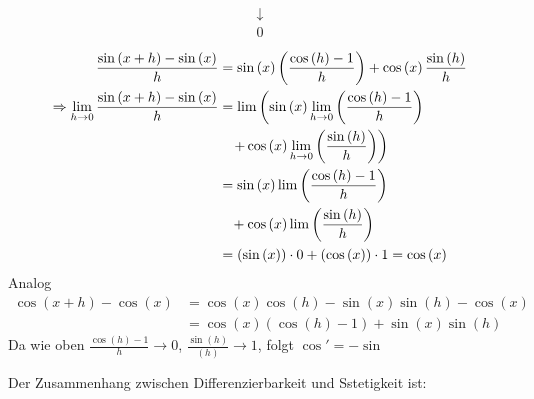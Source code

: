 \begin{enumerate}
\begin{align*}
{{{\begin{array}{*{20}{c}}
 \downarrow \\
0
\end{array}} }}
\end{align*}
\begin{align*}
\frac{{\sin \left( {x + h} \right) - \sin \left( x \right)}}{h} &= \sin \left( x \right)\left( {\frac{{\cos \left( h \right) - 1}}{h}} \right) + \cos \left( x \right)\frac{{\sin \left( h \right)}}{h}\\
 \Rightarrow \mathop {\lim }\limits_{h \to 0} \frac{{\sin \left( {x + h} \right) - \sin \left( x \right)}}{h} &= \lim \left( {\sin \left( x \right)\mathop {\lim }\limits_{h \to 0} \left( {\frac{{\cos \left( h \right) - 1}}{h}} \right)} \right.\\
&\left. { \hspace{3mm}+ \cos \left( x \right)\mathop {\lim }\limits_{h \to 0} \left( {\frac{{\sin \left( h \right)}}{h}} \right)} \right)\\
 &= \sin \left( x \right)\lim \left( {\frac{{\cos \left( h \right) - 1}}{h}} \right)\\
 &\hspace{3mm}+ \cos \left( x \right)\lim \left( {\frac{{\sin \left( h \right)}}{h}} \right)\\
& = \left( {\sin \left( x \right)} \right) \cdot 0 + \left( {\cos \left( x \right)} \right) \cdot 1 = \cos \left( x \right)
\end{align*}
Analog
\begin{align*}
\cos \left( {x + h} \right) - \cos \left( x \right) &= \cos \left( x \right)\cos \left( h \right) - \sin \left( x \right)\sin \left( h \right) - \cos \left( x \right)\\
& = \cos \left( x \right)\left( {\cos \left( h \right) - 1} \right) + \sin \left( x \right)\sin \left( h \right)
\end{align*}
Da wie oben $\frac{{\cos \left( h \right) - 1}}{h} \to 0$, $\frac{{\sin \left( h \right)}}{{\left( h \right)}} \to 1$, folgt $\cos'=-\sin$
\end{enumerate}
Der Zusammenhang zwischen Differenzierbarkeit und Sstetigkeit ist:
